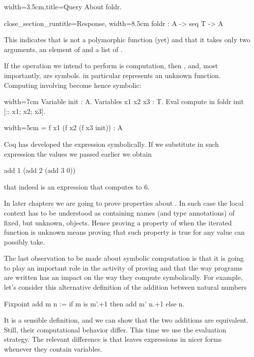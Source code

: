 \begin{coq}{}{width=3.5cm,title=Query}
About foldr.
\end{coq}
\begin{coqout}{close_section_run}{title=Response, width=8.5cm}
foldr : A -> seq T -> A
\end{coqout}

This indicates that  is not a polymorphic function (yet)
and that it takes only two arguments, an element of  and
a list of .

If the operation we intend to perform is computation, then
,  and, most importantly,  are symbols.
  in particular represents an unknown function.
Computing involving  become hence symbolic:

\begin{coq}{}{width=7cm}
Variable init : A.
Variables x1 x2 x3 : T.
Eval compute in
  foldr init [:: x1; x2; x3].
\end{coq}
\begin{coqout}{}{width=5cm}
= f x1 (f x2 (f x3 init))
: A	
\end{coqout}

Coq has developed the expression symbolically.  If we substitute
in such expression the values we passed earlier we obtain

\begin{coq}{}{}
add 1 (add 2 (add 3 0))
\end{coq}
that indeed is an expression that computes to 6.

In later chapters we are going to prove properties about .
In such case the local context has to be understood as containing
names (and type annotations) of fixed, but unknown, objects.
Hence proving a property of  when the iterated function
 is unknown means proving that such property is true for any
value  can possibly take.

The last observation to be made about symbolic computation is that
it is going to play an important role in the activity of proving
and that the way programs are written has an impact on the way they
compute symbolically.  For example, let's consider this alternative
definition of the addition between natural numbers

\begin{coq}{}{}
Fixpoint add m n := if m is m'.+1 then add m' n.+1 else n.
\end{coq}

It is a sensible definition, and we can show that the two additions
are equivalent.  Still, their computational behavior differ.
This time we use the  evaluation strategy.  The relevant difference
is that  leaves expressions in nicer forms whenever they contain
variables.

